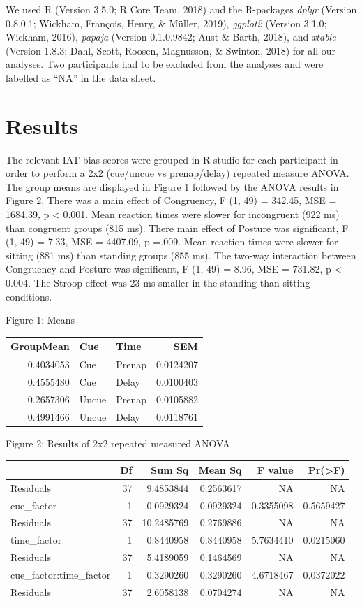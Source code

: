 \documentclass[man,floatsintext]{apa6}
\begin{document}
We used R (Version 3.5.0; R Core Team, 2018) and the R-packages
\emph{dplyr} (Version 0.8.0.1; Wickham, François, Henry, \& Müller,
2019), \emph{ggplot2} (Version 3.1.0; Wickham, 2016), \emph{papaja}
(Version 0.1.0.9842; Aust \& Barth, 2018), and \emph{xtable} (Version
1.8.3; Dahl, Scott, Roosen, Magnusson, \& Swinton, 2018) for all our
analyses. Two participants had to be excluded from the analyses and were
labelled as \enquote{NA} in the data sheet.

\section{Results}\label{results}

The relevant IAT bias scores were grouped in R-studio for each
participant in order to perform a 2x2 (cue/uncue vs prenap/delay)
repeated measure ANOVA. The group means are displayed in Figure 1
followed by the ANOVA results in Figure 2. There was a main effect of
Congruency, F (1, 49) = 342.45, MSE = 1684.39, p \textless{} 0.001. Mean
reaction times were slower for incongruent (922 ms) than congruent
groups (815 ms). There main effect of Posture was significant, F (1, 49)
= 7.33, MSE = 4407.09, p =.009. Mean reaction times were slower for
sitting (881 ms) than standing groups (855 ms). The two-way interaction
between Congruency and Posture was significant, F (1, 49) = 8.96, MSE =
731.82, p \textless{} 0.004. The Stroop effect was 23 ms smaller in the
standing than sitting conditions.

Figure 1: Means

\begin{tabular}{r|l|l|r}
\hline
GroupMean & Cue & Time & SEM\\
\hline
0.4034053 & Cue & Prenap & 0.0124207\\
\hline
0.4555480 & Cue & Delay & 0.0100403\\
\hline
0.2657306 & Uncue & Prenap & 0.0105882\\
\hline
0.4991466 & Uncue & Delay & 0.0118761\\
\hline
\end{tabular}

Figure 2: Results of 2x2 repeated measured ANOVA

\begin{tabular}{l|r|r|r|r|r}
\hline
  & Df & Sum Sq & Mean Sq & F value & Pr(>F)\\
\hline
Residuals & 37 & 9.4853844 & 0.2563617 & NA & NA\\
\hline
cue\_factor & 1 & 0.0929324 & 0.0929324 & 0.3355098 & 0.5659427\\
\hline
Residuals & 37 & 10.2485769 & 0.2769886 & NA & NA\\
\hline
time\_factor & 1 & 0.8440958 & 0.8440958 & 5.7634410 & 0.0215060\\
\hline
Residuals & 37 & 5.4189059 & 0.1464569 & NA & NA\\
\hline
cue\_factor:time\_factor & 1 & 0.3290260 & 0.3290260 & 4.6718467 & 0.0372022\\
\hline
Residuals & 37 & 2.6058138 & 0.0704274 & NA & NA\\
\hline
\end{tabular}
\end{document}
